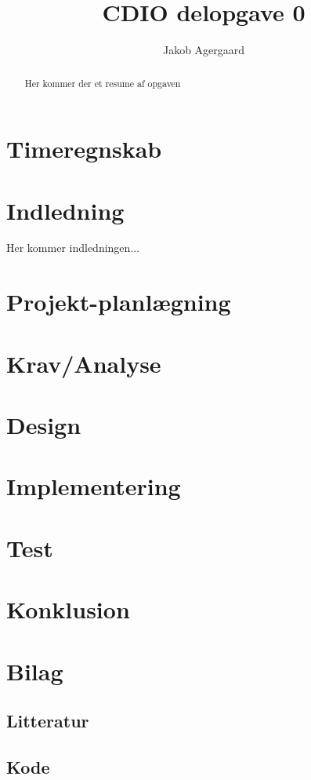 \documentclass{article}
\title{CDIO delopgave 0}
\author{Jakob Agergaard}
\begin{document}


\normalsize
\begin{abstract}
     Her kommer der et resume af opgaven
\end{abstract}

\tableofcontents

\section{Timeregnskab}

\section{Indledning}

Her kommer indledningen...

\section{Projekt-planlægning}

\section{Krav/Analyse}

\section{Design}

\section{Implementering}

\section{Test}

\section{Konklusion}

\section{Bilag}
\subsection{Litteratur}
\subsection{Kode}
\end{document}

